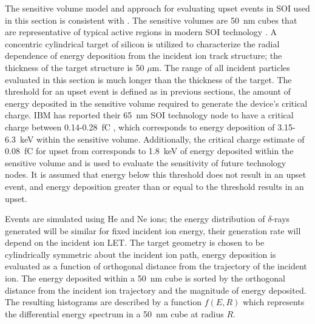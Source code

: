 The sensitive volume model and approach for evaluating upset events in SOI used in this section is consistent with \cite{King:2010jg,King:2012cb,Haran:2008ve}.
The sensitive volumes are 50~nm cubes that are representative of typical active regions in modern SOI technology \cite{Haran:2008ve}. 
A concentric cylindrical target of silicon is utilized to characterize the radial dependence of energy deposition from the incident ion track structure; the thickness of the target structure is 50 $\mu$m. 
The range of all incident particles evaluated in this section is much longer than the thickness of the target. 
The threshold for an upset event is defined as in previous sections, the amount of energy deposited in the sensitive volume required to generate the device’s critical charge.
IBM has reported their 65~nm SOI technology node to have a critical charge between 0.14-0.28~fC \cite{Rodbell:2007vl}, which corresponds to energy deposition of 3.15-6.3~keV within the sensitive volume. 
Additionally, the critical charge estimate of 0.08~fC for upset from \cite{King:2010jg} corresponds to 1.8~keV of energy deposited within the sensitive volume and is used to evaluate the sensitivity of future technology nodes. 
It is assumed that energy below this threshold does not result in an upset event, and energy deposition greater than or equal to the threshold results in an upset.

Events are simulated using He and Ne ions; the energy 
distribution of $\delta$-rays generated will be similar for fixed  
incident ion energy, their generation rate will depend on the incident ion
LET.
The target geometry is chosen to be cylindrically symmetric about the incident ion path, energy deposition is evaluated as a function of orthogonal distance from the trajectory of the incident ion. 
The energy deposited within a 50~nm cube is sorted by the orthogonal distance from the incident ion trajectory and the magnitude of energy deposited.
The resulting histograms are described by a function $f(E,R)$ which represents the differential energy spectrum in a 50~nm cube at radius $R$.

